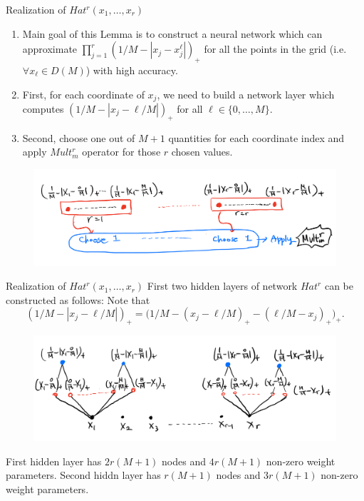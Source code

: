 \documentclass{if-beamer}
\begin{document}
\begin{frame}{Realization of $Hat^{r}(x_{1},\dots,x_{r})$}
\begin{enumerate}
    \item Main goal of this Lemma is to construct a neural network which can approximate $\prod_{j=1}^{r}(1/M - |x_{j}-x_{j}^{\ell}|)_{+}$ for all the points in the grid (i.e. $\forall x_{\ell}\in D(M)$) with high accuracy.
    
    \item First, for each coordinate of $x_{j}$, we need to build a network layer which computes $(1/M - |x_{j}-\ell/M|)_{+}$ for all $\ell\in\{0,\dots,M\}$.
    
    \item Second, choose one out of $M+1$ quantities for each coordinate index and apply $Mult_{m}^{r}$ operator for those $r$ chosen values. 
\end{enumerate}
    \begin{figure}[htbp]
        \includegraphics[width=1\textwidth]{LemmaB2.png}
        \label{fig:figure5}
    \end{figure}
\end{frame}

\begin{frame}{Realization of $Hat^{r}(x_{1},\dots,x_{r})$}
First two hidden layers of network $Hat^{r}$ can be constructed as follows:
Note that 
\begin{equation*}
    (1/M - |x_{j}-\ell/M|)_{+}=\big(1/M-(x_{j}-\ell/M)_{+}-(\ell/M-x_{j})_{+}\big)_{+}.
\end{equation*}

\begin{figure}[htbp]
    \includegraphics[width=1\textwidth]{LemmaB2_1.png}
    \label{fig:figure6}
\end{figure}

First hidden layer has $2r(M+1)$ nodes and $4r(M+1)$ non-zero weight parameters.
Second hiddn layer has $r(M+1)$ nodes and $3r(M+1)$ non-zero weight parameters.
    
\end{frame}
\end{document}
